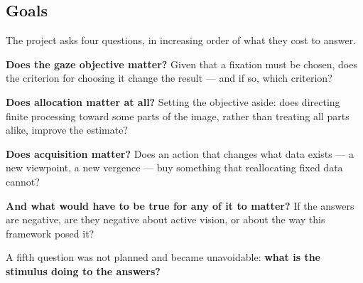 \subsection{Goals}

The project asks four questions, in increasing order of what they cost to
answer.

\textbf{Does the gaze objective matter?} Given that a fixation must be chosen,
does the criterion for choosing it change the result --- and if so, which
criterion?

\textbf{Does allocation matter at all?} Setting the objective aside: does
directing finite processing toward some parts of the image, rather than treating
all parts alike, improve the estimate?

\textbf{Does acquisition matter?} Does an action that changes what data exists
--- a new viewpoint, a new vergence --- buy something that reallocating fixed
data cannot?

\textbf{And what would have to be true for any of it to matter?} If the answers
are negative, are they negative about active vision, or about the way this
framework posed it?

A fifth question was not planned and became unavoidable: \textbf{what is the
stimulus doing to the answers?}
